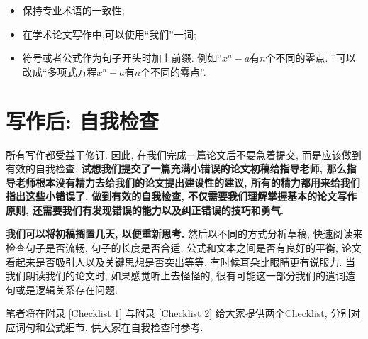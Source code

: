 \documentclass{booki}
\newcommand{\setParDis}{\setlength {\parskip} {0.3cm} }
\begin{document}
\begin{itemize}
    \item {保持专业术语的一致性}{;}
    \item {在学术论文写作中,可以使用{``}我们''一词}{;}
    \item {符号或者公式作为句子开头时加上前缀.} 例如{``}$x^{n}-a$有$n$个不同的零点. ''可以改成{``}多项式方程$x^{n}-a$有$n$个不同的零点''{.}
\end{itemize}
\section{写作后: 自我检查}
所有写作都受益于修订. 因此, 在我们完成一篇论文后不要急着提交, 而是应该做到有效的自我检查. \textbf{试想我们提交了一篇充满小错误的论文初稿给指导老师, 那么指导老师根本没有精力去给我们的论文提出建设性的建议, 所有的精力都用来给我们指出这些小错误了.} \textbf{做到有效的自我检查, 不仅需要我们理解掌握基本的论文写作原则, 还需要我们有发现错误的能力以及纠正错误的技巧和勇气. }\par
\textbf{我们可以将初稿搁置几天, 以便重新思考. }然后以不同的方式分析草稿, 快速阅读来检查句子是否流畅, 句子的长度是否合适, 公式和文本之间是否有良好的平衡, 论文看起来是否吸引人以及关键思想是否突出等等. 有时候耳朵比眼睛更有说服力. 当我们朗读我们的论文时, 如果感觉听上去怪怪的, 很有可能这一部分我们的遣词造句或是逻辑关系存在问题. \par
{笔者将在附录 \ref{Checklist 1} 与附录 \ref{Checklist 2} 给大家提供两个Checklist\cite{TanChecklist}, 分别对应词句和公式细节, 供大家在自我检查时参考.}
\end{document}
